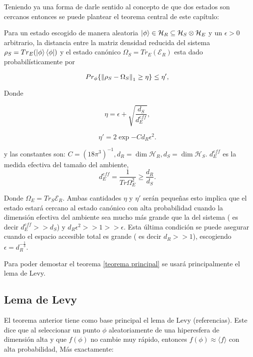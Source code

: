 Teniendo ya una forma de darle sentido al concepto de que dos estados son cercanos entonces se puede plantear el teorema central de este capítulo:
\\
\begin{theorem} \label{teorema principal}
Para un estado escogido de manera aleatoria $\ket{\phi} \in \mathcal{H}_{R} \subseteq \mathcal{H}_{S} \otimes \mathcal{H}_{E} $ y un $\epsilon > 0$ arbitrario, la distancia entre la matriz densidad reducida del sistema $\rho_{S}=Tr_{E}(\ket{\phi} \bra{\phi})$  y el estado canónico $\Omega_{S}=Tr_{E} ( \mathcal{E}_{R})$ esta dado probabilísticamente por 

\begin{equation}
Pr_{\phi} \{  \norm{\rho_{S} -\Omega_{S}}_{1} \geq \eta \} \leq \eta',
\end{equation}

Donde 

\begin{equation}
\eta= \epsilon + \sqrt{ \frac{d_{S}}{d_{E}^{eff}} },
\end{equation}

\begin{equation}
\eta'=2\exp{-C d_{R} \epsilon^{2} }.
\end{equation}


y las constantes son: $ C=(18 \pi^{3})^{-1}, d_{R} = \dim \mathcal{H}_{R}, d_{S} = \dim \mathcal{H}_{S} $. $d_{E}^{eff}$ es la medida efectiva del tamaño del ambiente,
\begin{equation}
d_{E}^{eff}= \frac{1}{Tr \Omega_{E}^{2}} \ge \frac{d_{R}}{d_{S}}.
\end{equation}

Donde $\Omega_{E}= Tr_{S} \mathcal{E}_{R}$. Ambas cantidades $\eta $ y $\eta'$ serán pequeñas esto implica que el estado estará cercano al estado canónico con alta probabilidad cuando la dimensión efectiva del ambiente sea mucho más grande que la del sistema ( es decir $d_{E}^{eff} >> d_{S}$) y  $d_{R}\epsilon^2>>1>>\epsilon$. Esta última condición se puede asegurar cuando el espacio accesible total es grande ( es decir $d_{R}>>1$), escogiendo $\epsilon=d_{R}^{-\frac{1}{3}}$.\\
\end{theorem}
Para poder demostar el teorema \ref{teorema principal} se usará principalmente el lema de Levy. 
\subsection{Lema de Levy}
El teorema anterior tiene como base principal el lema de Levy (referencias). Este dice que al seleccionar un punto $\phi$ aleatoriamente de una hiperesfera de dimensión alta y que $f(\phi)$ no cambie muy rápido, entonces $f(\phi) \approx \langle f \rangle $ con alta probabilidad, Más exactamente:\\

